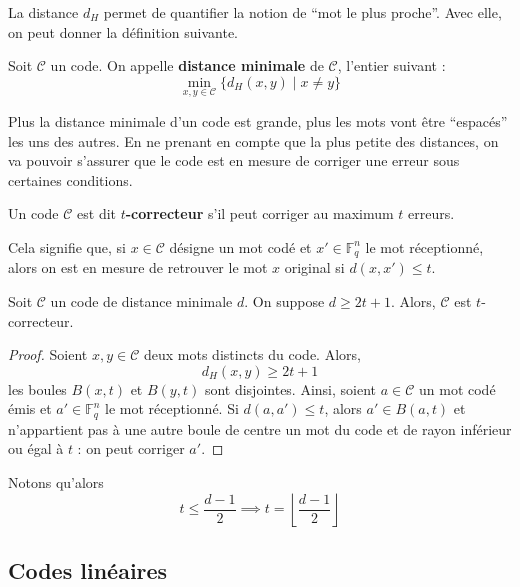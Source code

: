 	La distance $d_H$ permet de quantifier la notion de ``mot le plus proche''. Avec elle, on peut donner la définition suivante.
	
	\begin{definition}
		Soit $\mathcal{C}$ un code. On appelle \textbf{distance minimale} de $\mathcal{C}$, l'entier suivant :
		\[ \min_{x,y \in \mathcal{C}} \{ d_H(x,y) \mid x \neq y \} \]
	\end{definition}
	
	Plus la distance minimale d'un code est grande, plus les mots vont être ``espacés'' les uns des autres. En ne prenant en compte que la plus petite des distances, on va pouvoir s'assurer que le code est en mesure de corriger une erreur sous certaines conditions.
	
	\begin{definition}
		Un code $\mathcal{C}$ est dit \textbf{$t$-correcteur} s'il peut corriger au maximum $t$ erreurs.
	\end{definition}
	
	\begin{remark}
		Cela signifie que, si $x \in \mathcal{C}$ désigne un mot codé et $x' \in \mathbb{F}_q^n$ le mot réceptionné, alors on est en mesure de retrouver le mot $x$ original si $d(x,x') \leq t$. 
	\end{remark}
	
	\begin{proposition}
		Soit $\mathcal{C}$ un code de distance minimale $d$. On suppose $d \geq 2t + 1$. Alors, $\mathcal{C}$ est $t$-correcteur.
	\end{proposition}
	
	\begin{proof}
		Soient $x, y \in \mathcal{C}$ deux mots distincts du code. Alors,
		\[ d_H(x,y) \geq 2t+1 \]
		les boules $B(x,t)$ et $B(y,t)$ sont disjointes.
		Ainsi, soient $a \in \mathcal{C}$ un mot codé émis et $a' \in \mathbb{F}_q^n$ le mot réceptionné. Si $d(a,a') \leq t$, alors $a' \in B(a,t)$ et n'appartient pas à une autre boule de centre un mot du code et de rayon inférieur ou égal à $t$ : on peut corriger $a'$.
	\end{proof}
	
	\begin{remark}
		\label{codes-correcteurs-1}
		Notons qu'alors
		\[ t \leq \frac{d-1}{2} \implies t = \left\lfloor \frac{d-1}{2} \right\rfloor \]
	\end{remark}
	
	\subsection{Codes linéaires}
	
